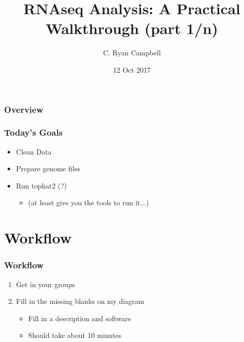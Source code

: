 \documentclass[14pt,handout]{beamer}
\title[RNAseq Practical pt1]{RNAseq Analysis: A Practical Walkthrough (part 1/n)} %
\author{C. Ryan Campbell} %
\institute[Duke] %
{
Duke University \\ %
\medskip
\textit{c.ryan.campbell@duke.edu} %
}
\date{12 Oct 2017} %
\begin{document}
\begin{frame}
\titlepage %
\end{frame}

\begin{frame}
\frametitle{Overview} %
\tableofcontents %
\end{frame}


\begin{frame}
\frametitle{Today's Goals}
\begin{itemize}
	\item<+-> Clean Data
	\item<+-> Prepare genome files
	\item<+-> Run tophat2 (?)
	\begin{itemize}
		\item<+-> (at least give you the tools to run it...)
	\end{itemize}
\end{itemize}
\end{frame}

\section{Workflow}

\begin{frame}
\frametitle{Workflow}
\begin{enumerate}
	\large
	\item<+-> Get in your groups
	\item<+-> Fill in the missing blanks on my diagram
	\begin{itemize}
		\item<+-> Fill in a description and software
		\item<+-> Should take about 10 minutes
	\end{itemize}
\end{enumerate}
\end{frame}
\end{document}
